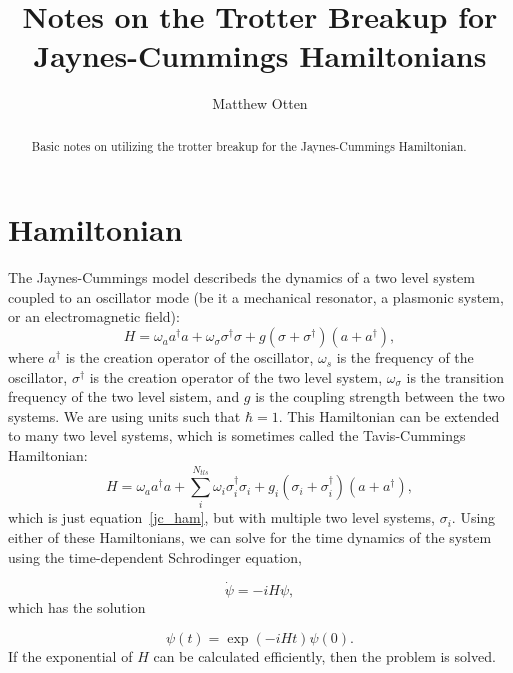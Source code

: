\documentclass{article}
\begin{document}
\title{Notes on the Trotter Breakup for Jaynes-Cummings Hamiltonians}
\author{Matthew Otten}

\maketitle

\begin{abstract}
  Basic notes on utilizing the trotter breakup for the Jaynes-Cummings Hamiltonian.
\end{abstract}

\section{Hamiltonian}
The Jaynes-Cummings model describeds the dynamics of
a two level system coupled to an oscillator mode (be it a mechanical resonator, a
plasmonic system, or an electromagnetic field):
\begin{equation}\label{jc_ham}
  H =  \omega_a a^\dagger a +  \omega_\sigma \sigma^\dagger \sigma +
   g (\sigma + \sigma^\dagger ) ( a + a^\dagger),
\end{equation}
where $a^\dagger$ is the creation operator of the oscillator, $\omega_s$ is the frequency
of the oscillator, $\sigma^\dagger$ is the creation operator of the two level system,
$\omega_\sigma$ is the transition frequency of the two level sistem, and $g$ is the
coupling strength between the two systems. We are using units such that $\hbar = 1$.
This Hamiltonian can be extended to many two level systems, which is sometimes
called the Tavis-Cummings Hamiltonian:
\begin{equation}\label{tc_ham}
  H =  \omega_a a^\dagger a +  \sum_i^{N_{tls}}\omega_i \sigma_i^\dagger \sigma_i +
   g_i ( \sigma_i + \sigma_i^\dagger) ( a + a^\dagger),
\end{equation}
which is just equation~\ref{jc_ham}, but with multiple two level systems,
$\sigma_i$. Using either of these Hamiltonians, we can solve for the time
dynamics of the system using the time-dependent Schrodinger equation,

\begin{equation}\label{schrod}
  \dot{\psi} = -i H \psi,
\end{equation}
which has the solution

\begin{equation}\label{solution}
  \psi (t) = \exp(-i H t) \psi (0).
\end{equation}
If the exponential of $H$ can be calculated efficiently, then the problem is
solved.
\end{document}
